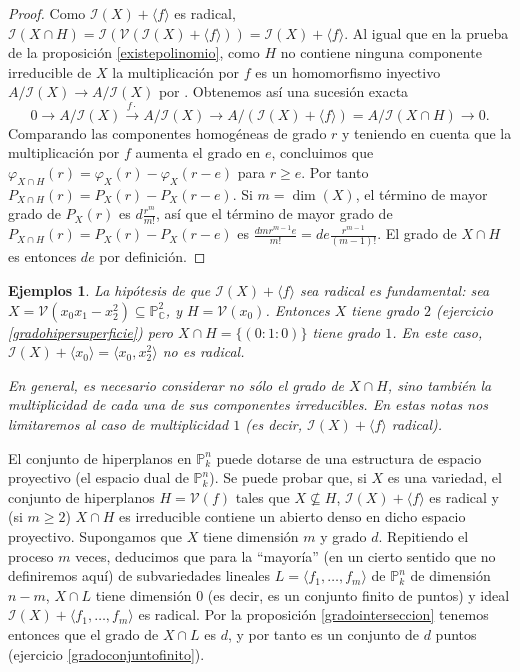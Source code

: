 \documentclass[a4paper,10pt]{book}
\newtheorem{eje}[thm]{Ejemplos}
\newcommand{\CC}{\mathbb C}
\newcommand{\PP}{\mathbb P}
\newcommand{\Pnk}{\PP^n_k}
\newcommand{\II}{{\mathcal I}}
\newcommand{\VV}{{\mathcal V}}
\begin{document}
\begin{proof}
 Como $\II(X)+\langle f\rangle$ es radical, $\II(X\cap H)=\II(\VV(\II(X)+\langle f\rangle))=\II(X)+\langle f\rangle$. Al igual que en la prueba de la proposición \ref{existepolinomio}, como $H$ no contiene ninguna componente irreducible de $X$ la multiplicación por $f$ es un homomorfismo inyectivo $A/\II(X)\to A/\II(X)$ por \cite[Proposición 4.7]{am}. Obtenemos así una sucesión exacta
$$
0\to A/\II(X)\stackrel{f \cdot}{\to} A/\II(X) \to A/(\II(X)+\langle f\rangle)=A/\II(X\cap H)\to 0.
$$
Comparando las componentes homogéneas de grado $r$ y teniendo en cuenta que la multiplicación por $f$ aumenta el grado en $e$, concluimos que $\varphi_{X\cap H}(r)=\varphi_X(r)-\varphi_X(r-e)$ para $r\geq e$. Por tanto $P_{X\cap H}(r)=P_X(r)-P_X(r-e)$. Si $m=\dim(X)$, el término de mayor grado de $P_X(r)$ es $d\frac{r^m}{m!}$, así que el término de mayor grado de $P_{X\cap H}(r)=P_X(r)-P_X(r-e)$ es $\frac{dmr^{m-1}e}{m!}=de\frac{r^{m-1}}{(m-1)!}$. El grado de $X\cap H$ es entonces $de$ por definición. 
\end{proof}

\begin{eje}
 \emph{La hipótesis de que $\II(X)+\langle f\rangle$ sea radical es fundamental: sea $X=\VV(x_0x_1-x_2^2)\subseteq\PP^2_\CC$, y $H=\VV(x_0)$. Entonces $X$ tiene grado $2$ (ejercicio \ref{gradohipersuperficie}) pero $X\cap H=\{(0:1:0)\}$ tiene grado $1$. En este caso, $\II(X)+\langle x_0\rangle=\langle x_0,x_2^2\rangle$ no es radical.}

\emph{En general, es necesario considerar no sólo el grado de $X\cap H$, sino también la \emph{multiplicidad} de cada una de sus componentes irreducibles. En estas notas nos limitaremos al caso de multiplicidad $1$ (es decir, $\II(X)+\langle f\rangle$ radical).}
\end{eje}

El conjunto de hiperplanos en $\Pnk$ puede dotarse de una estructura de espacio proyectivo (el espacio dual de $\Pnk$). Se puede probar que, si $X$ es una variedad, el conjunto de hiperplanos $H=\VV(f)$ tales que $X\not\subseteq H$, $\II(X)+\langle f\rangle$ es radical y (si $m\geq 2$) $X\cap H$ es irreducible contiene un abierto denso en dicho espacio proyectivo. Supongamos que $X$ tiene dimensión $m$ y grado $d$. Repitiendo el proceso $m$ veces, deducimos que para la ``mayoría'' (en un cierto sentido que no definiremos aquí) de subvariedades lineales $L=\langle f_1,\ldots,f_m\rangle$ de $\Pnk$ de dimensión $n-m$, $X\cap L$ tiene dimensión $0$ (es decir, es un conjunto finito de puntos) y ideal $\II(X)+\langle f_1,\ldots,f_m\rangle$ es radical. Por la proposición \ref{gradointerseccion} tenemos entonces que el grado de $X\cap L$ es $d$, y por tanto es un conjunto de $d$ puntos (ejercicio \ref{gradoconjuntofinito}).
\end{document}
